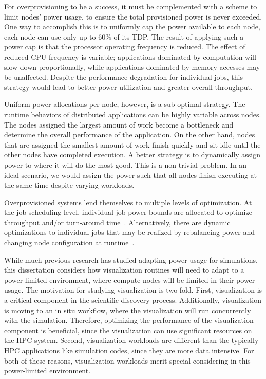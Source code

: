 For overprovisioning to be a success, it must be complemented with a scheme to
limit nodes' power usage, to ensure the total provisioned power is never
exceeded.
%
One way to accomplish this is to uniformly cap the power available to each
node, \eg each node can use only up to $60\%$ of its TDP.
%
The result of applying such a power cap is that the processor operating
frequency is reduced.
%
The effect of reduced CPU frequency is variable; applications dominated by
computation
will slow down proportionally, while applications dominated by memory accesses may
be unaffected.
%
Despite the performance degradation for individual jobs, this strategy
would lead to better power utilization and greater overall throughput.

Uniform power allocations per node, however, is a sub-optimal strategy.
%
The runtime behaviors of distributed applications can be
highly variable across nodes.
%
The nodes assigned the largest amount of work become a bottleneck and determine
the overall performance of the application.
%
On the other hand, nodes that are assigned the smallest amount of work finish
quickly and sit idle until the other nodes have completed execution.
%
A better strategy is to dynamically assign power to where it will do the most good.
%
This is a non-trivial problem.
%
In an ideal scenario, we would assign the power such that all nodes finish
executing at the same time despite varying workloads.

Overprovisioned systems lend themselves to multiple levels of
optimization.
%
At the job scheduling level, individual job power bounds are allocated to
optimize throughput and/or turn-around
time~\cite{Patki:2015:PRM:2749246.2749262}.
%
Alternatively, there are dynamic optimizations to individual jobs that may be
realized by rebalancing power and changing node configuration at
runtime~\cite{geopm,10.1007/978-3-319-58667-0_21,Marathe2015}.

While much previous research has studied adapting power usage for simulations,
this dissertation considers how visualization routines will need
to adapt to a power-limited environment, where compute nodes will be limited in
their power usage.
%
The motivation for studying visualization is two-fold.
%
First, visualization is a critical component in the scientific discovery
process.
%
Additionally, visualization is moving to an in situ workflow, where the
visualization will run concurrently with the simulation.
%
Therefore, optimizing the performance of the visualization component is
beneficial, since the visualization can use significant resources on the HPC
system.
%
Second, visualization workloads are different than the typically HPC
applications like simulation codes, since they are more data intensive.
%
For both of these reasons, visualization workloads merit special considering in
this power-limited environment.

